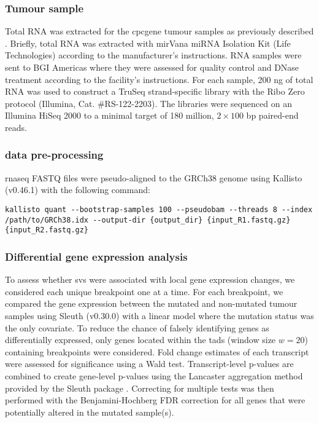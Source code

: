 \subsubsection{Tumour sample }

Total RNA was extracted for the \gls{cpcgene} tumour samples as previously described \cite{chenWidespreadFunctionalRNA2019}.
Briefly, total RNA was extracted with mirVana miRNA Isolation Kit (Life Technologies) according to the manufacturer's instructions.
RNA samples were sent to BGI Americas where they were assessed for quality control and DNase treatment according to the facility's instructions.
For each sample, 200 ng of total RNA was used to construct a TruSeq strand-specific library with the Ribo Zero protocol (Illumina, Cat. \#RS-122-2203).
The libraries were sequenced on an Illumina HiSeq 2000 to a minimal target of 180 million, $2 \times 100$ bp paired-end reads.

\subsubsection{ data pre-processing}

\gls{rnaseq} FASTQ files were pseudo-aligned to the GRCh38 genome using Kallisto (v0.46.1) \cite{brayNearoptimalProbabilisticRNAseq2016} with the following command:

\begin{lstlisting}[basicstyle=\ttfamily]
kallisto quant --bootstrap-samples 100 --pseudobam --threads 8 --index /path/to/GRCh38.idx --output-dir {output_dir} {input_R1.fastq.gz} {input_R2.fastq.gz}
\end{lstlisting}

\subsubsection{Differential gene expression analysis}

To assess whether \glspl{sv} were associated with local gene expression changes, we considered each unique breakpoint one at a time.
For each breakpoint, we compared the gene expression between the mutated and non-mutated tumour samples using Sleuth (v0.30.0) \cite{pimentelDifferentialAnalysisRNAseq2017,yiGenelevelDifferentialAnalysis2018} with a linear model where the mutation status was the only covariate.
To reduce the chance of falsely identifying genes as differentially expressed, only genes located within the \glspl{tad} (window size  $w = 20$) containing breakpoints were considered.
Fold change estimates of each transcript were assessed for significance using a Wald test.
Transcript-level p-values are combined to create gene-level p-values using the Lancaster aggregation method provided by the Sleuth package \cite{yiGenelevelDifferentialAnalysis2018}.
Correcting for multiple tests was then performed with the Benjamini-Hochberg FDR correction for all genes that were potentially altered in the mutated sample(s).

